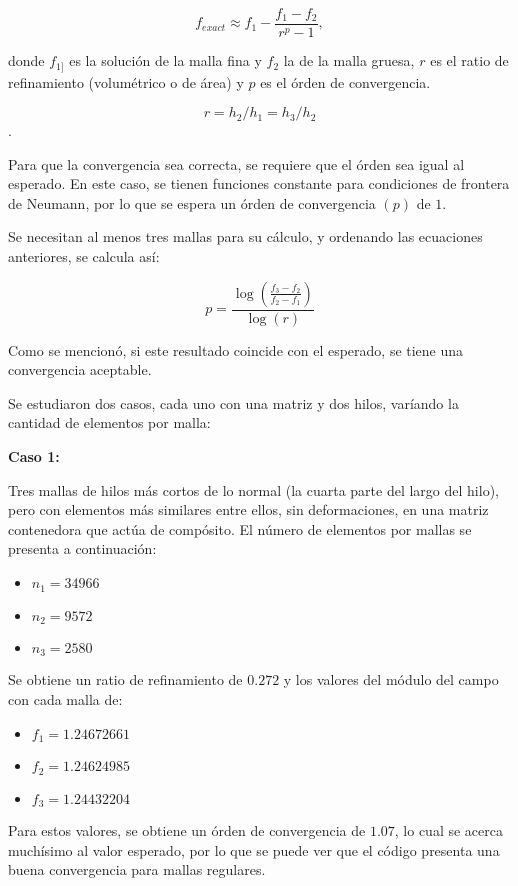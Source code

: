 \documentclass[12pt,letterpaper]{report}
\numberwithin{equation}{section}
\begin{document}
$$f_{exact}\approx f_1-\frac{f_1-f_2}{r^p-1},$$

donde $f_{1]}$ es la solución de la malla fina y $f_{2}$ la de la malla gruesa, $r$ es el ratio de refinamiento (volumétrico o de área) y $p$ es el órden de convergencia. 

$$r = h_2/h_1=h_3/h_2$$. 

Para que la convergencia sea correcta, se requiere que el órden sea igual al esperado. En este caso, se tienen funciones constante para condiciones de frontera de Neumann, por lo que se espera un órden de convergencia $(p)$ de $1$.

Se necesitan al menos tres mallas para su cálculo, y ordenando las ecuaciones anteriores, se calcula así:

$$p = \frac{\log(\frac{f_3-f_2}{f_2-f_1})}{\log(r)}$$

Como se mencionó, si este resultado coincide con el esperado, se tiene una convergencia aceptable. \cite{paperprofe}

Se estudiaron dos casos, cada uno con una matriz y dos hilos, varíando la cantidad de elementos por malla:

\vspace{3mm}

\textbf{Caso 1:}

\vspace{3mm}

Tres mallas de hilos más cortos de lo normal (la cuarta parte del largo del hilo), pero con elementos más similares entre ellos, sin deformaciones, en una matriz contenedora que actúa de compósito. El número de elementos por mallas se presenta a continuación:

\begin{itemize}
	\item $n_1 = 34966$
	\item $n_2 = 9572$
	\item $n_3 = 2580$
\end{itemize}

Se obtiene un ratio de refinamiento de $0.272$ y los valores del módulo del campo con cada malla de:

\begin{itemize}
	\item $f_1 = 1.24672661$
	\item $f_2 = 1.24624985$
	\item $f_3 = 1.24432204$
\end{itemize}

Para estos valores, se obtiene un órden de convergencia de $1.07$, lo cual se acerca muchísimo al valor esperado, por lo que se puede ver que el código presenta una buena convergencia para mallas regulares.
\end{document}
